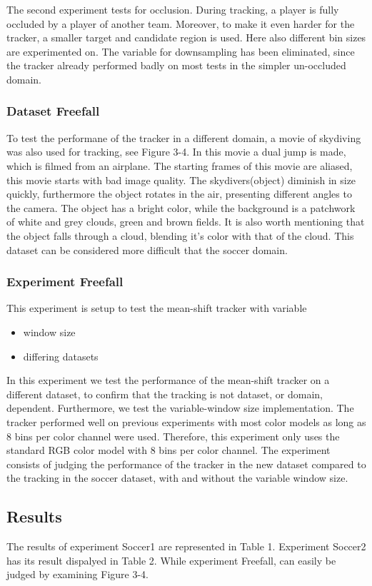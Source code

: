 \documentclass[a4paper,11pt]{article}
\begin{document}
The second experiment tests for occlusion. During tracking, a player is fully
occluded by a player of another team. Moreover, to make it even harder for the
tracker, a smaller target and candidate region is used. Here also different bin sizes are experimented on.
The variable for downsampling has been eliminated, since the tracker already performed badly on most tests in the simpler un-occluded domain.

\subsubsection{Dataset Freefall}
To test the performane of the tracker in a different domain, a movie of
skydiving was also used for tracking, see Figure 3-4. In this movie a dual jump is made, which is
filmed from an airplane. The starting frames of this movie are aliased, this movie starts with bad image quality.
The skydivers(object) diminish in size quickly, furthermore the object rotates in the air, presenting different angles to the camera. The object has a bright color, while the background is a patchwork of white and grey clouds, green and brown fields. It is also worth mentioning that the object falls through a cloud, blending it's color with that of the cloud.
This dataset can be considered more difficult that the soccer domain.
 

\subsubsection{Experiment Freefall}
This experiment is setup to test the mean-shift tracker with variable
\begin{itemize}
\item window size
\item differing datasets
\end{itemize}

In this experiment we test the performance of the mean-shift tracker on a different dataset, to confirm that the tracking is not dataset, or domain, dependent. Furthermore, we test the variable-window size implementation. 
The tracker performed well on previous experiments with most color models as long as 8 bins per
color channel were used. Therefore, this experiment only uses the standard RGB color model with 8 bins per color channel.
The experiment consists of judging the performance of the tracker in the new dataset compared to the tracking in the soccer dataset, with and without the variable window size.

\subsection{Results} 
The results of experiment Soccer1 are represented in Table 1. Experiment Soccer2 has its result dispalyed in Table 2. While experiment Freefall, can easily be judged by examining Figure 3-4.
\end{document}
